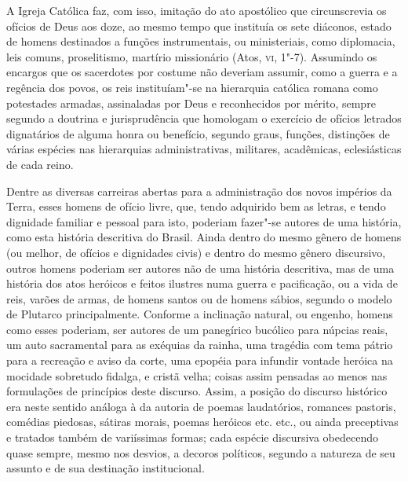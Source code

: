 A Igreja Católica faz, com isso, imitação do ato apostólico que
circunscrevia os ofícios de Deus aos doze, ao mesmo tempo que instituía
os sete diáconos, estado de homens destinados a funções instrumentais,
ou ministeriais, como diplomacia, leis comuns, proselitismo, martírio
missionário (Atos, \textsc{vi}, 1"-7). Assumindo os encargos que os sacerdotes
por costume não deveriam assumir, como a guerra e a regência dos povos,
os reis instituíam"-se na hierarquia católica romana como potestades
armadas, assinaladas por Deus e reconhecidos por mérito, sempre segundo
a doutrina e jurisprudência que homologam o exercício de ofícios
letrados dignatários de alguma honra ou benefício, segundo graus,
funções, distinções de várias espécies nas hierarquias administrativas,
militares, acadêmicas, eclesiásticas de cada reino. 

Dentre as diversas carreiras abertas para a administra\-ção dos novos
impérios da Terra, esses homens de ofício livre, que, tendo adquirido
bem as letras, e tendo dignidade familiar e pessoal para isto, poderiam
fazer"-se autores de uma história,
como esta história descritiva do Brasil. Ainda dentro do mesmo gênero
de homens (ou melhor, de ofícios e dignidades civis) e dentro do mesmo
gênero discursivo, outros homens poderiam ser autores não de uma
história descritiva, mas de uma história dos atos heróicos e feitos
ilustres numa guerra e pacificação, ou a vida de reis, varões de armas,
de homens santos ou de homens sábios, segundo o modelo de Plutarco
principalmente. Conforme a inclinação natural, ou engenho, homens como
esses poderiam, ser autores de um panegírico bucólico para núpcias
reais, um auto sacramental para as exéquias da rainha, uma tragédia com
tema pátrio para a recreação e aviso da corte, uma epopéia para
infundir vontade heróica na mocidade sobretudo fidalga, e cristã velha;
coisas assim pensadas ao menos nas formulações de princípios deste
discurso. Assim, a posição do discurso histórico era neste sentido
análoga à da autoria de poemas laudatórios, romances pastoris, comédias
piedosas, sátiras morais, poemas heróicos etc. etc., ou ainda
preceptivas e tratados também de variíssimas formas; cada espécie
discursiva obedecendo quase sempre, mesmo nos desvios, a decoros
políticos, segundo a natureza de seu assunto e de sua destinação institucional.

